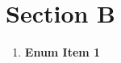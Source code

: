 \documentclass{article}
\begin{document}
\section{Section B}



\begin{enumerate}[label=\bfseries \arabic*:]
  \item \textbf{Enum Item 1} \lipsum*[1-1] 

\end{enumerate}

 

\printbibliography

\end{document}
